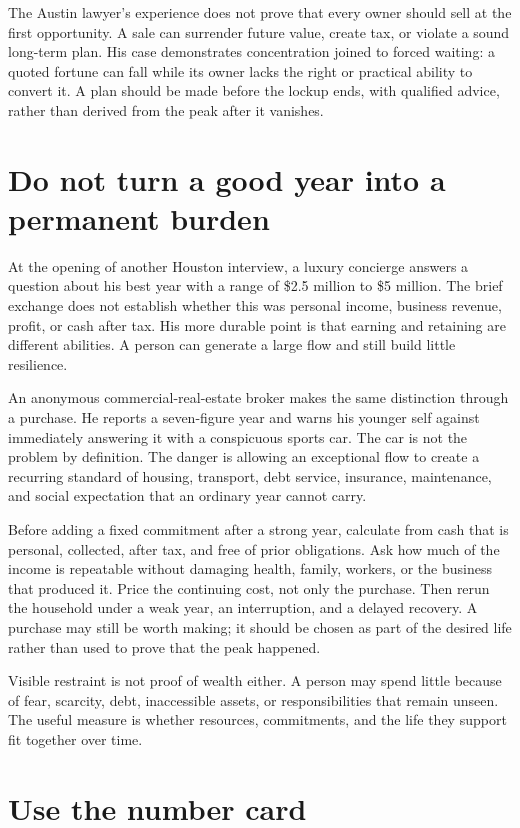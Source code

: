 The Austin lawyer's experience does not prove that every owner should sell at
the first opportunity. A sale can surrender future value, create tax, or
violate a sound long-term plan. His case demonstrates concentration joined to
forced waiting: a quoted fortune can fall while its owner lacks the right or
practical ability to convert it. A plan should be made before the lockup ends,
with qualified advice, rather than derived from the peak after it vanishes.

\section{Do not turn a good year into a permanent burden}

At the opening of another Houston interview, a luxury concierge answers a
question about his best year with a range of \$2.5 million to \$5 million. The
brief exchange does not establish whether this was personal income, business
revenue, profit, or cash after tax. His more durable point is that earning and
retaining are different abilities. A person can generate a large flow and
still build little resilience.

An anonymous commercial-real-estate broker makes the same distinction through
a purchase. He reports a seven-figure year and warns his younger self against
immediately answering it with a conspicuous sports car. The car is not the
problem by definition. The danger is allowing an exceptional flow to create a
recurring standard of housing, transport, debt service, insurance, maintenance,
and social expectation that an ordinary year cannot carry.

Before adding a fixed commitment after a strong year, calculate from cash that
is personal, collected, after tax, and free of prior obligations. Ask how much
of the income is repeatable without damaging health, family, workers, or the
business that produced it. Price the continuing cost, not only the purchase.
Then rerun the household under a weak year, an interruption, and a delayed
recovery. A purchase may still be worth making; it should be chosen as part of
the desired life rather than used to prove that the peak happened.

Visible restraint is not proof of wealth either. A person may spend little
because of fear, scarcity, debt, inaccessible assets, or responsibilities that
remain unseen. The useful measure is whether resources, commitments, and the
life they support fit together over time.

\section{Use the number card}

